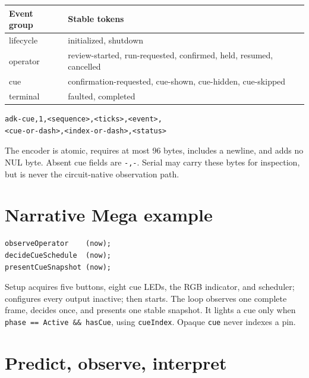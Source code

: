 \documentclass[11pt]{article}
\begin{document}
\begin{tabularx}{\linewidth}{@{}l X@{}}
\toprule
Event group & Stable tokens\\
\midrule
lifecycle & initialized, shutdown\\
operator & review-started, run-requested, confirmed, held, resumed, cancelled\\
cue & confirmation-requested, cue-shown, cue-hidden, cue-skipped\\
terminal & faulted, completed\\
\bottomrule
\end{tabularx}

\begin{lstlisting}[style=adkcpp]
adk-cue,1,<sequence>,<ticks>,<event>,
<cue-or-dash>,<index-or-dash>,<status>
\end{lstlisting}

The encoder is atomic, requires at most 96 bytes, includes a newline, and adds
no NUL byte. Absent cue fields are \texttt{-,-}. Serial may carry these bytes
for inspection, but is never the circuit-native observation path.

\section{Narrative Mega example}

\begin{lstlisting}[style=adkcpp]
observeOperator    (now);
decideCueSchedule  (now);
presentCueSnapshot (now);
\end{lstlisting}

Setup acquires five buttons, eight cue LEDs, the RGB indicator, and scheduler;
configures every output inactive; then starts. The loop observes one complete
frame, decides once, and presents one stable snapshot. It lights a cue only
when \texttt{phase == Active \&\& hasCue}, using \texttt{cueIndex}. Opaque
\texttt{cue} never indexes a pin.

\section{Predict, observe, interpret}
\end{document}
